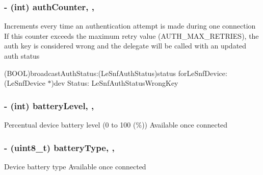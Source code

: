 \subsubsection[{auth\+Counter}]{\setlength{\rightskip}{0pt plus 5cm}-\/ (int) auth\+Counter\hspace{0.3cm}{\ttfamily [read]}, {\ttfamily [nonatomic]}, {\ttfamily [assign]}}\label{interface_le_snf_device_a3453d599afd1532dc29f04762271bc7e}
Increments every time an authentication attempt is made during one connection If this counter exceeds the maximum retry value (A\+U\+T\+H\+\_\+\+M\+A\+X\+\_\+\+R\+E\+T\+R\+I\+E\+S), the auth key is considered wrong and the delegate will be called with an updated auth status
\begin{DoxyItemize}
\item (B\+O\+O\+L)broadcast\+Auth\+Status\+:(\+Le\+Snf\+Auth\+Status)status for\+Le\+Snf\+Device\+:(\+Le\+Snf\+Device $\ast$)dev Status\+: Le\+Snf\+Auth\+Status\+Wrong\+Key 
\end{DoxyItemize}\hypertarget{interface_le_snf_device_ac2b0d74394b6ba30b0306ef86a4504c9}{}
\subsubsection[{battery\+Level}]{\setlength{\rightskip}{0pt plus 5cm}-\/ (int) battery\+Level\hspace{0.3cm}{\ttfamily [read]}, {\ttfamily [nonatomic]}, {\ttfamily [assign]}}\label{interface_le_snf_device_ac2b0d74394b6ba30b0306ef86a4504c9}
Percentual device battery level (0 to 100 (\%)) Available once connected \hypertarget{interface_le_snf_device_aa5fd5e351c6b9da96031fa5574e4873d}{}
\subsubsection[{battery\+Type}]{\setlength{\rightskip}{0pt plus 5cm}-\/ (uint8\+\_\+t) battery\+Type\hspace{0.3cm}{\ttfamily [read]}, {\ttfamily [nonatomic]}, {\ttfamily [assign]}}\label{interface_le_snf_device_aa5fd5e351c6b9da96031fa5574e4873d}
Device battery type Available once connected \hypertarget{interface_le_snf_device_a27787e4c4cac8f6d4e79fbb0f02ab596}{}
